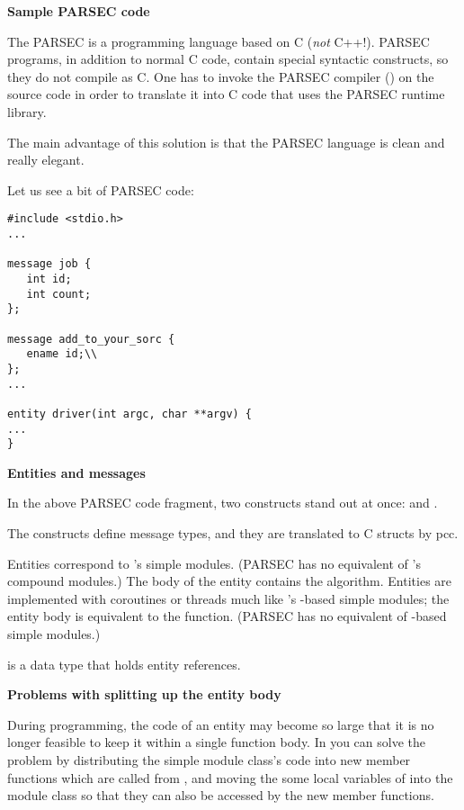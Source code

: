 \textbf{Sample PARSEC code}


The PARSEC is a programming language based on C (\textit{not} C++!). 
PARSEC programs, in addition to normal C code, contain special 
syntactic constructs, so they do not compile as C. One has to 
invoke the PARSEC compiler () on the source code in order 
to translate it into C code that uses the PARSEC runtime library.


The main advantage of this solution is that the PARSEC language 
is clean and really elegant.


Let us see a bit of PARSEC code:

\begin{Verbatim}
#include <stdio.h>
...

message job {
   int id;
   int count;
};

message add_to_your_sorc {
   ename id;\\
};
...

entity driver(int argc, char **argv) {
...
}
\end{Verbatim}

\textbf{Entities and messages}


In the above PARSEC code fragment, two constructs stand out at 
once:  and .

The  constructs define message types, and they are translated 
to C structs by pcc. 


Entities correspond to {\opp}'s simple modules.
(PARSEC has no equivalent of {\opp}'s compound
modules.) The body of the entity contains the algorithm. Entities are
implemented with coroutines or threads much like {\opp}'s
-based simple modules; the
entity body is equivalent to the  function.  (PARSEC
has no equivalent of -based
simple modules.)


 is a data type that holds entity references.


\textbf{Problems with splitting up the entity body}


During programming, the code of an entity may become so large 
that it is no longer feasible to keep it within a single function 
body. In {\opp} you can solve the problem by distributing the 
simple module class's  code into new member functions 
which are called from , and moving the some local variables 
of  into the module class so that they can also be 
accessed by the new member functions.

